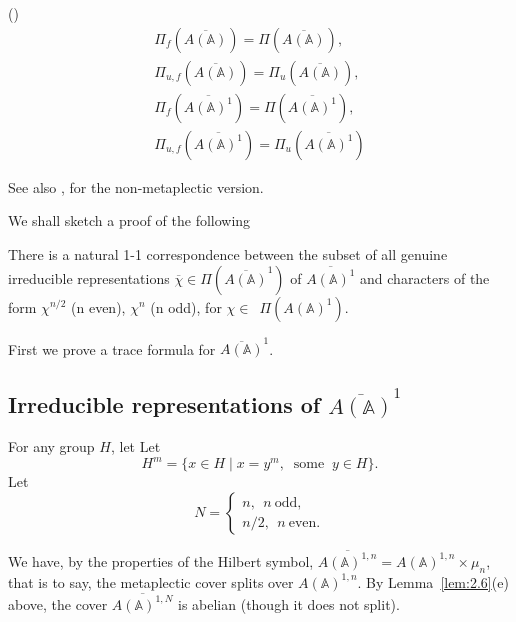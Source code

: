 \begin{lemma}\label{lem:3.1} (\cite[\S 3]{Ge2})
\[
\begin{array}{c}    
\Pi_f (\overline{A({\mathbb{A}})})=\Pi (\overline{A({\mathbb{A}})}),\\
\Pi_{u,f} (\overline{A({\mathbb{A}})})=\Pi_u (\overline{A({\mathbb{A}})}),\\
\Pi_f (\overline{A({\mathbb{A}})^1})=\Pi (\overline{A({\mathbb{A}})^1}),\\
\Pi_{u,f} (\overline{A({\mathbb{A}})^1})=\Pi_u (\overline{A({\mathbb{A}})^1})
\end{array}
\]
\end{lemma}

See also \cite{Ge1}, \cite{F} for the non-metaplectic version.

We shall sketch a proof of the following

\begin{theorem}\label{thm:3.2}
There is a natural 1-1 correspondence between the subset of all genuine
irreducible representations
$\overline{\chi }\in \Pi (\overline{A({\mathbb{A}})}^1)$
of $\overline{A({\mathbb{A}})^1}$ and characters of the form
$\chi ^{n/2}$ (n even), $\chi ^n$ (n odd),
for $\chi \in $\ $\Pi (A({\mathbb{A}})^1)$.
\end{theorem}

First we prove a trace formula for $\overline{A({\mathbb{A}})}^1$.

\subsection{Irreducible representations of $\overline{A({\mathbb{A}})}^1$}

For any group $H$, let
Let 
\begin{equation}\label{eq:3.5}
H^m
=\{x\in H\;|\;x=y^m,\;\;\mathrm{some}
\;\;y\in H\}.
\end{equation}
Let 
\begin{equation}\label{eq:3.6}
N=
\left\{
\begin{array}{c}
n,\ \ n \mathrm{\ odd},\\
n/2,\ \ n \mathrm{\ even}.
\end{array}
\right.
\end{equation}

We have, by the properties of the Hilbert
symbol,
$\overline{A({{\mathbb{A}}})^{1,n}}=A({{\mathbb{A}}})^{1,n}\times \mu _n$,
that is to say, the metaplectic cover
splits over $A({{\mathbb{A}}})^{1,n}$.
By Lemma~\ref{lem:2.6}(e) above, the cover
$\overline{A({{\mathbb{A}}})^{1,N}}$ is abelian (though it
does not split).


